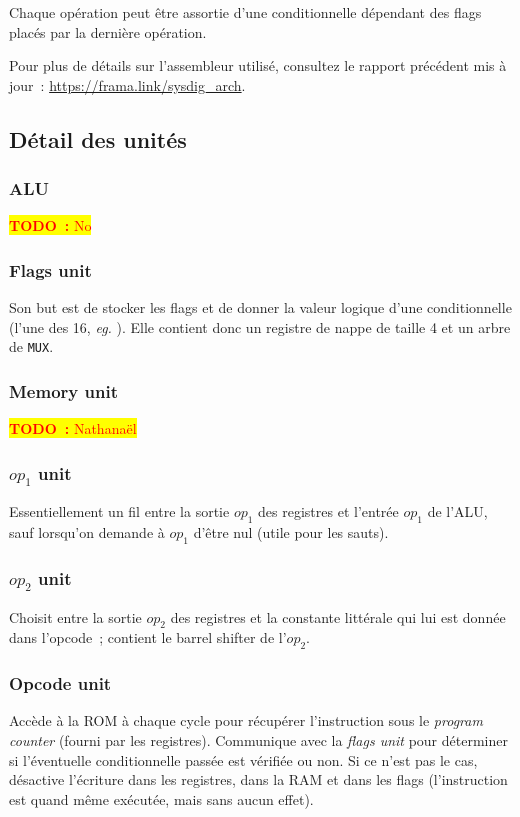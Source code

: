 \documentclass[11pt,a4paper]{article}
\newcommand{\todo}[1]{\colorbox{yellow}{\textcolor{red}{\textbf{TODO~:} #1}}}
\begin{document}
Chaque opération peut être assortie d'une conditionnelle dépendant des flags placés par la dernière opération.

Pour plus de détails sur l'assembleur utilisé, consultez le rapport précédent mis à jour~: \url{https://frama.link/sysdig_arch}.

\subsection{Détail des unités}

\subsubsection{ALU} \label{sssec:procunit_alu}
\todo{No}

\subsubsection{Flags unit}

Son but est de stocker les flags et de donner la valeur logique d'une conditionnelle (l'une des 16, \textit{eg.} ). Elle contient donc un registre de nappe de taille 4 et un arbre de \texttt{MUX}.

\subsubsection{Memory unit} \label{sssec:procunit_mem}
\todo{Nathanaël}

\subsubsection{$op_1$ unit}
Essentiellement un fil entre la sortie $op_1$ des registres et l'entrée $op_1$ de l'ALU, sauf lorsqu'on demande à $op_1$ d'être nul (utile pour les sauts).

\subsubsection{$op_2$ unit}
Choisit entre la sortie $op_2$ des registres et la constante littérale qui lui est donnée dans l'opcode~; contient le barrel shifter de l'$op_2$.

\subsubsection{Opcode unit} \label{sssec:procunit_opcode}
Accède à la ROM à chaque cycle pour récupérer l'instruction sous le \textit{program counter} (fourni par les registres). Communique avec la \textit{flags unit} pour déterminer si l'éventuelle conditionnelle passée est vérifiée ou non. Si ce n'est pas le cas, désactive l'écriture dans les registres, dans la RAM et dans les flags (l'instruction est quand même exécutée, mais sans aucun effet).
\end{document}
